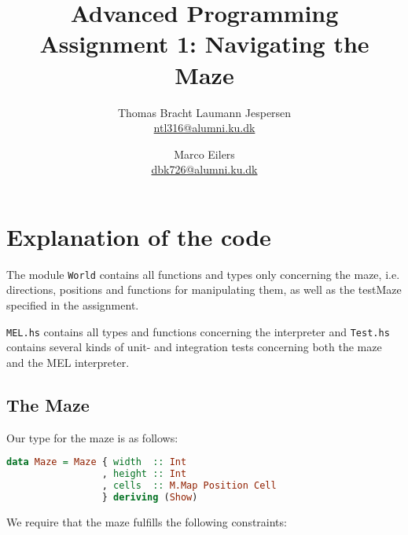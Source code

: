 \documentclass[a4paper]{article}
\title{Advanced Programming\\
Assignment 1: Navigating the Maze}
\author{Thomas Bracht Laumann Jespersen\\ \url{ntl316@alumni.ku.dk} \and Marco Eilers\\ \url{dbk726@alumni.ku.dk} }
\newcommand{\src}[1]{\texttt{#1}\xspace}
\begin{document}
\maketitle


\section{Explanation of the code}
The module \src{World} contains all functions and types only concerning the maze, i.e. directions, positions and functions for manipulating them, as well as the testMaze specified in the assignment. 

\src{MEL.hs} contains all types and functions concerning the interpreter and \src{Test.hs} contains several kinds of unit- and integration tests concerning both the maze and the MEL interpreter.

\subsection{The Maze}
Our type for the maze is as follows:
\begin{lstlisting}[language=haskell]
data Maze = Maze { width  :: Int
                 , height :: Int
                 , cells  :: M.Map Position Cell
                 } deriving (Show)
\end{lstlisting}

We require that the maze fulfills the following constraints:  
\end{document}
